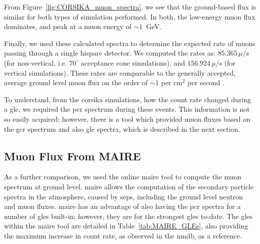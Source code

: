 From Figure~\ref{fig:CORSIKA_muon_spectra}, we see that the ground-based flux is similar for both types of simulation performed. In both, the low-energy muon flux dominates, and peak at a muon energy of $\sim 1$~GeV.

Finally, we used these calculated spectra to determine the expected rate of muons passing through a single \gls{hisparc} detector. We computed the rates as: $85.365 \, \mu/\mathrm{s}$ (for non-vertical, i.e. $70^\circ$ acceptance cone simulations), and $156.924 \, \mu/\mathrm{s}$ (for vertical simulations). These rates are comparable to the generally accepted, average ground level muon flux on the order of $\sim 1$ per cm$^2$ per second \citep{blackmore_terrestrial_2015, pereira_ground_2020}.

To understand, from the \gls{corsika} simulations, how the count rate changed during a \gls{gle}, we required the \gls{pcr} spectrum during these events. This information is not so easily acquired; however, there is a tool which provided muon fluxes based on the \gls{gcr} spectrum and also \gls{gle} spectra, which is described in the next section.



\subsection{Muon Flux From MAIRE}\label{sec:MAIRE_flux}

As a further comparison, we used the online \gls{maire} tool to compute the muon spectrum at ground level. \gls{maire} allows the computation of the secondary particle spectra in the atmosphere, caused by \glspl{sep}, including the ground level neutron and muon fluxes. \gls{maire} has an advantage of also having the \gls{pcr} spectra for a number of \glspl{gle} built-in; however, they are for the strongest \glspl{gle} to-date. The \glspl{gle} within the \gls{maire} tool are detailed in Table~\ref{tab:MAIRE_GLEs}, also providing the maximum increase in count rate, as observed in the \gls{nmdb}, as a reference.

